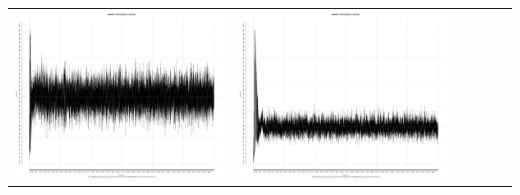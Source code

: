 \begin{table}[htbp]
{\begin{tabular}{l | ccccc}
\begin{minipage}{.15\textwidth}
     			 	\includegraphics[width=\linewidth]{images/mema-triple/I9}
    				 \end{minipage}
    			   &	 \begin{minipage}{.15\textwidth}\vspace{2pt}     							
     			 	\includegraphics[width=\linewidth]{images/mema-triple/I12}
    				 \end{minipage}
    			   &	 \begin{minipage}{.15\textwidth}\vspace{2pt}     							

\end{minipage}
\end{tabular}}
\end{table}

